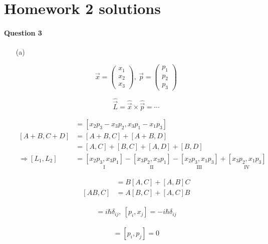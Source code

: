 \documentclass[11pt,a4paper]{article}
\author{Zehao Gao}
\begin{document}
%

\section*{Homework 2 solutions}

\paragraph*{Question 3}

\begin{enumerate}
\item[(a)]

\begin{equation}
    \vec{x}=
    \begin{pmatrix}
    x_1 \\
    x_2 \\
    x_3
    \end{pmatrix},\ 
    \vec{p}=
    \begin{pmatrix}
    p_1 \\
    p_2 \\
    p_3
    \end{pmatrix}
\end{equation}

\begin{equation}
    \hat{\vec{L}}=\hat{\vec{x}}\times\hat{\vec{p}}=\cdots
\end{equation}

\begin{align}
    [\hat{L}_1,\hat{L}_2]&=[x_2p_3-x_3p_2,x_3p_1-x_1p_3]\\
    [A+B,C+D]&=[A+B,C]+[A+B,D]\\
    &=[A,C]+[B,C]+[A,D]+[B,D]\\
    \Rightarrow
    [L_1,L_2]&=\underset{\mbox{I}}{[x_2p_3,x_3p_1]}-\underset{\mbox{II}}{[x_3p_2,x_3p_1]}-\underset{\mbox{III}}{[x_2p_3,x_1p_3]}+\underset{\mbox{IV}}{[x_3p_2,x_1p_3]}
\end{align}

\begin{align}
    [A,BC]&=B[A,C]+[A,B]C \\
    [AB,C]&=A[B,C]+[A,C]B
\end{align}

\begin{align}
    [x_i,p_j]=i\hbar\delta_{ij},\ [p_i,x_j]=-i\hbar\delta_{ij}
\end{align}

\begin{align}
    [x_i,x_j]=[p_i,p_j]=0
\end{align}


\end{enumerate}
\end{document}
